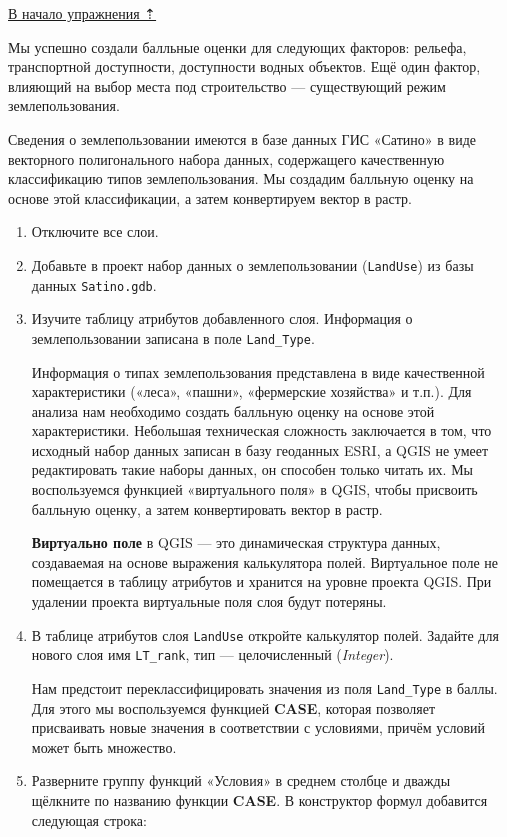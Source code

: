 \documentclass[
  12pt,
]{book}
\begin{document}
\protect\hyperlink{weighted-overlay}{В начало упражнения ⇡}

Мы успешно создали балльные оценки для следующих факторов: рельефа, транспортной доступности, доступности водных объектов. Ещё один фактор, влияющий на выбор места под строительство --- существующий режим землепользования.

Сведения о землепользовании имеются в базе данных ГИС «Сатино» в виде векторного полигонального набора данных, содержащего качественную классификацию типов землепользования. Мы создадим балльную оценку на основе этой классификации, а затем конвертируем вектор в растр.

\begin{enumerate}
\def\labelenumi{\arabic{enumi}.}
\item
  Отключите все слои.
\item
  Добавьте в проект набор данных о землепользовании (\texttt{LandUse}) из базы данных \texttt{Satino.gdb}.
\item
  Изучите таблицу атрибутов добавленного слоя. Информация о землепользовании записана в поле \texttt{Land\_Type}.

  Информация о типах землепользования представлена в виде качественной характеристики («леса», «пашни», «фермерские хозяйства» и т.п.). Для анализа нам необходимо создать балльную оценку на основе этой характеристики. Небольшая техническая сложность заключается в том, что исходный набор данных записан в базу геоданных ESRI, а QGIS не умеет редактировать такие наборы данных, он способен только читать их. Мы воспользуемся функцией «виртуального поля» в QGIS, чтобы присвоить балльную оценку, а затем конвертировать вектор в растр.

  \textbf{Виртуально поле} в QGIS --- это динамическая структура данных, создаваемая на основе выражения калькулятора полей. Виртуальное поле не помещается в таблицу атрибутов и хранится на уровне проекта QGIS. При удалении проекта виртуальные поля слоя будут потеряны.
\item
  В таблице атрибутов слоя \texttt{LandUse} откройте калькулятор полей. Задайте для нового слоя имя \texttt{LT\_rank}, тип --- целочисленный (\emph{Integer}).

  Нам предстоит переклассифицировать значения из поля \texttt{Land\_Type} в баллы. Для этого мы воспользуемся функцией \textbf{CASE}, которая позволяет присваивать новые значения в соответствии с условиями, причём условий может быть множество.
\item
  Разверните группу функций «Условия» в среднем столбце и дважды щёлкните по названию функции \textbf{CASE}. В конструктор формул добавится следующая строка:


\end{enumerate}
\end{document}
